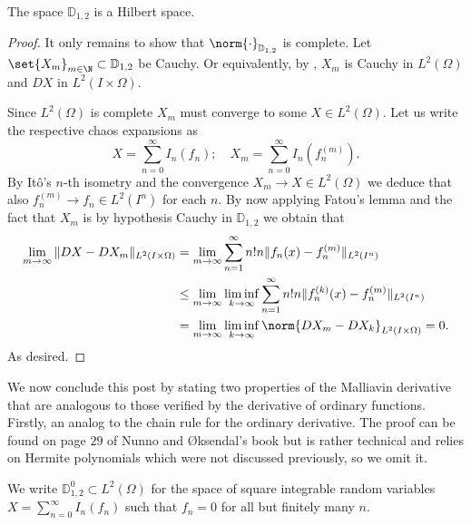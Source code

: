 \documentclass[
    a4paper,
    DIV=14,
    abstract=true,
    numbers=noenddot
]{scrartcl}
\begin{document}
\begin{proposition}
	The space $\mathbb{D}_{1,2}$ is a Hilbert space.
\end{proposition}
\begin{proof}
It only remains to show that $\norm{\cdot }_{\mathbb{D}_{1,2}}$ is complete. Let $\set{X_m}_{m \in \N} \subset  \mathbb{D}_{1,2}$ be Cauchy. Or equivalently, by , $X_m$ is Cauchy in $L^2(\Omega)$ and $DX$ in $L^2(I \times \Omega)$.

Since $L^2(\Omega)$ is complete $X_m$ must converge to some  $X\in L^2(\Omega)$. Let us write the respective chaos expansions as
	\begin{equation*}
		X=\sum_{n=0}^{\infty} I_n(f_n);\quad X_m=\sum_{n=0}^{\infty} I_n(f_n^{(m)}).
	\end{equation*}
	By Itô's $n$-th isometry and the convergence $X_m\to X\in L^2(\Omega)$ we deduce that also $f^{(m)}_n\to f_n\in L^2(I^n)$ for each $n$.    By now applying Fatou's lemma and the fact that $X_m$ is by hypothesis Cauchy in  $\mathbb{D}_{1,2}$ we obtain that
	\begin{align*}
		\lim_{m \to \infty}\|DX-DX_m\|_{L^2(I \times \Omega)}&=\lim_{m \to \infty}\sum_{n=1}^{\infty} n!n \|f_n(x)-f_n^{(m)}\|_{L^2(I^n)}\\
		&\leq \lim_{m \to \infty}\liminf_{k \to \infty}\sum_{n=1}^{\infty} n!n \|f_n^{(k)}(x)-f_n^{(m)}\|_{L^2(I^n)}\\
		&=\lim_{m \to \infty}\liminf_{k \to \infty}\norm{DX_m-DX_k}_{L^2(I \times \Omega)}=0.
	\end{align*}
	As desired.
\end{proof}
We now conclude this post by stating two  properties of the Malliavin derivative that are analogous to those verified by the derivative of ordinary functions. Firstly, an analog to the chain rule for the ordinary derivative. The proof can be found on page $29$ of Nunno and Øksendal's book \cite{nunno2008malliavin} but is rather technical and relies on Hermite polynomials which were not discussed previously, so we omit it.
\begin{definition}
	We write $\mathbb{D}_{1,2}^0\subset L^2(\Omega)$ for the space of square integrable random variables $X=\sum_{n=0}^{\infty} I_n(f_n)$ such that $f_n=0$ for all but finitely many  $n$.
\end{definition}
\end{document}
